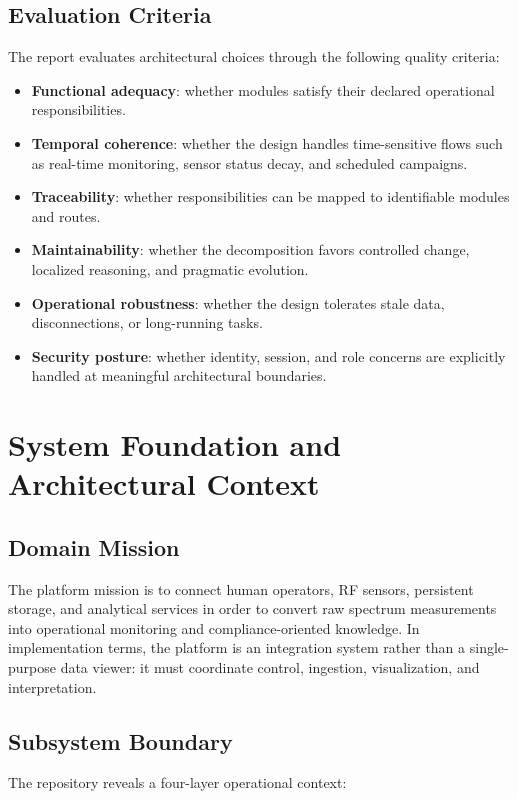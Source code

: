 \documentclass[11pt,a4paper]{article}
\begin{document}
\subsection{Evaluation Criteria}
The report evaluates architectural choices through the following quality criteria:

\begin{itemize}
  \item \textbf{Functional adequacy}: whether modules satisfy their declared operational responsibilities.
  \item \textbf{Temporal coherence}: whether the design handles time-sensitive flows such as real-time monitoring, sensor status decay, and scheduled campaigns.
  \item \textbf{Traceability}: whether responsibilities can be mapped to identifiable modules and routes.
  \item \textbf{Maintainability}: whether the decomposition favors controlled change, localized reasoning, and pragmatic evolution.
  \item \textbf{Operational robustness}: whether the design tolerates stale data, disconnections, or long-running tasks.
  \item \textbf{Security posture}: whether identity, session, and role concerns are explicitly handled at meaningful architectural boundaries.
\end{itemize}

\section{System Foundation and Architectural Context}

\subsection{Domain Mission}
The platform mission is to connect human operators, RF sensors, persistent storage, and analytical services in order to convert raw spectrum measurements into operational monitoring and compliance-oriented knowledge. In implementation terms, the platform is an integration system rather than a single-purpose data viewer: it must coordinate control, ingestion, visualization, and interpretation.

\subsection{Subsystem Boundary}
The repository reveals a four-layer operational context:
\end{document}
